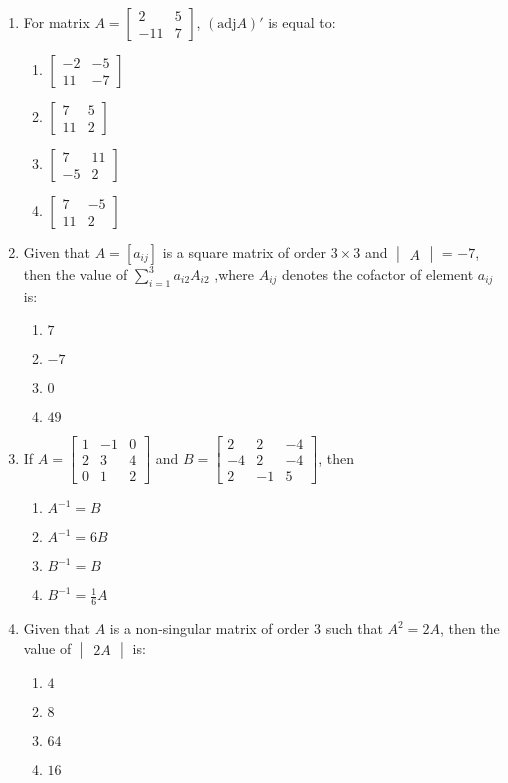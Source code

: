 \documentclass{article}
\providecommand{\myvec}[1]{\begin{bmatrix}#1\end{bmatrix}}
\providecommand{\mydet}[1]{\begin{vmatrix}#1\end{vmatrix}}
\begin{document}
\begin{enumerate}
    \item For matrix $A =\myvec{2&5 \\-11&7}$,
    $(\text{adj}A)'$ is equal to:
    \begin{enumerate}
        \item $\myvec{-2&-5\\11&-7}$
        \item $\myvec{7&5\\ 11&2}$
        \item $\myvec{7 &11\\-5&2}$
        \item $\myvec{7 & -5 \\11 & 2}$
    \end{enumerate}

    \item Given that $A = [a_{ij}]$ is a square matrix of order $3 \times 3$ and $\mydet{A}$ = $-7$, then the value of  $\sum_{i=1}^{3} a_{i2}A_{i2}$ ,where $A_{ij}$ denotes the cofactor of element $a_{ij}$ is:
    \begin{enumerate}
        \item $7$
        \item $-7$
        \item $0$
        \item $49$
    \end{enumerate}
    
    \item If $A =\myvec{1 &-1 & 0 \\2&3 & 4 \\0&1&2}$ and $B = \myvec{2&2&-4\\-4&2&-4\\2&-1&5}$, then
    \begin{enumerate}
        \item $A^{-1} = B$
        \item $A^{-1} = 6B$
        \item $B^{-1} = B$
        \item $B^{-1} = \frac{1}{6} A$
    \end{enumerate}
    \item Given that $A$ is a non-singular matrix of order $3$ such that $A^2 = 2A$, then the value of $\mydet{2A}$ is:\\
    \begin{enumerate}
        \item $4$
        \item $8$
        \item $64$
        \item $16$
    \end{enumerate}
    

\end{enumerate}
\end{document}
